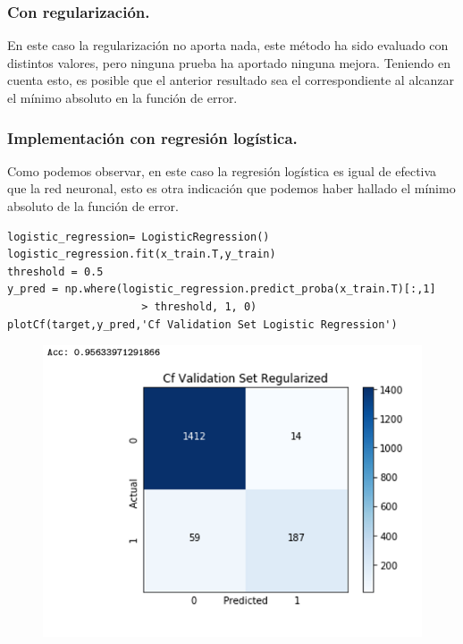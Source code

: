 \documentclass[a4paper,10pt]{article}
\begin{document}
\subsubsection{Con regularización.}
En este caso la regularización no aporta nada, este método ha sido evaluado con distintos valores, pero ninguna prueba ha aportado ninguna mejora. Teniendo en cuenta esto, es posible que el anterior resultado sea el correspondiente al alcanzar el mínimo absoluto en la función de error.

\subsubsection{Implementación con regresión logística.}
Como podemos observar, en este caso la regresión logística es igual de efectiva que la red neuronal, esto es otra indicación que podemos haber hallado el mínimo absoluto de la función de error.
\begin{lstlisting}
logistic_regression= LogisticRegression()
logistic_regression.fit(x_train.T,y_train)
threshold = 0.5
y_pred = np.where(logistic_regression.predict_proba(x_train.T)[:,1]
					 > threshold, 1, 0)
plotCf(target,y_pred,'Cf Validation Set Logistic Regression')
\end{lstlisting}
\begin{figure}[H]
\centering
\includegraphics[scale=0.6]{Annotation 2020-03-23 161410}
\end{figure}
\newpage
\end{document}
